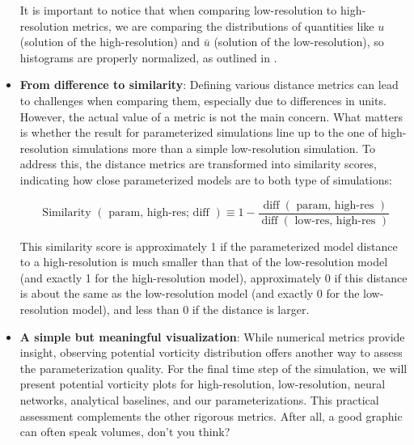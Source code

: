 \begin{itemize}
It is important to notice that when comparing low-resolution to high-resolution metrics, we are comparing the distributions of quantities like $u$ (solution of the high-resolution) and $\bar{u}$ (solution of the low-resolution), so histograms are properly normalized, as outlined in \cite{Benchmarking}.
	
	\vspace{0.3em}
\item \textbf{From difference to similarity}: Defining various distance metrics can lead to challenges when comparing them, especially due to differences in units. However, the actual value of a metric is not the main concern. What matters is whether the result for parameterized simulations line up to the one of high-resolution simulations more than a simple low-resolution simulation. To address this, the distance metrics are transformed into similarity scores, indicating how close parameterized models are to both type of simulations:

\vspace{0.2em}
\begin{equation}
\text { Similarity }(\text { param, high-res; diff }) \equiv 1-\frac{\operatorname{diff}(\text { param, high-res })}{\operatorname{diff}(\text { low-res, high-res })}
\end{equation}
\vspace{-0.1em}

This similarity score is approximately 1 if the parameterized model distance to a high-resolution is much smaller than that of the low-resolution model (and exactly 1 for the high-resolution model), approximately 0 if this distance is about the same as the low-resolution model (and exactly 0 for the low-resolution model), and less than 0 if the distance is larger.

	
\vspace{0.3em}
\item \textbf{A simple but meaningful visualization}: While numerical metrics provide insight, observing potential vorticity distribution offers another way to assess the parameterization quality. For the final time step of the simulation, we will present potential vorticity plots for high-resolution, low-resolution, neural networks, analytical baselines, and our parameterizations. This practical assessment complements the other rigorous metrics. After all, a good graphic can often speak volumes, don't you think?
 
\end{itemize}

